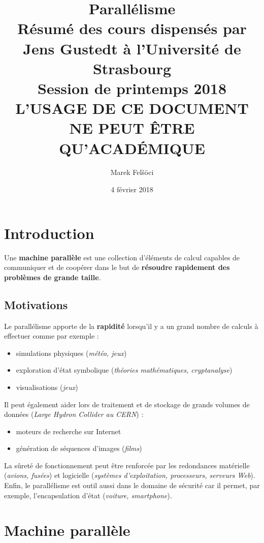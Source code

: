 \documentclass[12pt, a4paper]{article}
\title{
  \textbf{Parallélisme} \\
  \Large Résumé des cours dispensés par Jens Gustedt à l'Université de
  Strasbourg \\
  \large Session de printemps 2018 \\
  \huge L'USAGE DE CE DOCUMENT NE PEUT ÊTRE QU'ACADÉMIQUE
}
\author{Marek Felšöci}
\date{4 février 2018}
\begin{document}
  \maketitle
  \section{Introduction}
    Une \textbf{machine parallèle} est une collection d'éléments de calcul
    capables de communiquer et de coopérer dans le but de \textbf{résoudre
    rapidement des problèmes de grande taille}.
    \subsection{Motivations}
      Le parallélisme apporte de la \textbf{rapidité} lorsqu'il y a un grand
      nombre de calculs à effectuer comme par exemple :
      \begin{itemize}
        \item simulations physiques (\textit{météo, jeux})
        \item exploration d'état symbolique (\textit{théories mathématiques,
        cryptanalyse})
        \item visualisations (\textit{jeux})
      \end{itemize}
      Il peut également aider lors de traitement et de stockage de grands
      volumes de données (\textit{Large Hydron Collider au CERN}) :
      \begin{itemize}
        \item moteurs de recherche sur Internet
        \item génération de séquences d'images (\textit{films})
      \end{itemize}
      La sûreté de fonctionnement peut être renforcée par les redondances
      matérielle (\textit{avions, fusées}) et logicielle (\textit{systèmes
      d'exploitation, processeurs, serveurs Web}). Enfin, le parallélisme est
      outil aussi dans le domaine de sécurité car il permet, par exemple,
      l'encapsulation d'état (\textit{voiture, smartphone}).
  \section{Machine parallèle}
\end{document}
